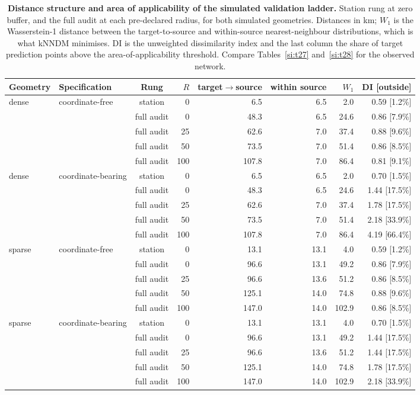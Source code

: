 \documentclass[11pt]{article}
\begin{document}
\begin{table}[htbp]\centering\footnotesize
\caption{\textbf{Distance structure and area of applicability of the simulated validation ladder.} Station rung at zero buffer, and the full audit at each pre-declared radius, for both simulated geometries. Distances in km; $W_1$ is the Wasserstein-1 distance between the target-to-source and within-source nearest-neighbour distributions, which is what kNNDM minimises. DI is the unweighted dissimilarity index and the last column the share of target prediction points above the area-of-applicability threshold. Compare Tables~\ref{si:t27} and~\ref{si:t28} for the observed network.}
\label{tab:simaoa}
\begin{tabular}{llcrrrrr}\toprule
Geometry & Specification & Rung & $R$ & target$\to$source & within source & $W_1$ & DI [outside] \\ \midrule
dense & coordinate-free & station & 0 & 6.5 & 6.5 & 2.0 & 0.59 [1.2\%] \\
 &  & full audit & 0 & 48.3 & 6.5 & 24.6 & 0.86 [7.9\%] \\
 &  & full audit & 25 & 62.6 & 7.0 & 37.4 & 0.88 [9.6\%] \\
 &  & full audit & 50 & 73.5 & 7.0 & 51.4 & 0.86 [8.5\%] \\
 &  & full audit & 100 & 107.8 & 7.0 & 86.4 & 0.81 [9.1\%] \\
\addlinespace
dense & coordinate-bearing & station & 0 & 6.5 & 6.5 & 2.0 & 0.70 [1.5\%] \\
 &  & full audit & 0 & 48.3 & 6.5 & 24.6 & 1.44 [17.5\%] \\
 &  & full audit & 25 & 62.6 & 7.0 & 37.4 & 1.78 [17.5\%] \\
 &  & full audit & 50 & 73.5 & 7.0 & 51.4 & 2.18 [33.9\%] \\
 &  & full audit & 100 & 107.8 & 7.0 & 86.4 & 4.19 [66.4\%] \\
\addlinespace
sparse & coordinate-free & station & 0 & 13.1 & 13.1 & 4.0 & 0.59 [1.2\%] \\
 &  & full audit & 0 & 96.6 & 13.1 & 49.2 & 0.86 [7.9\%] \\
 &  & full audit & 25 & 96.6 & 13.6 & 51.2 & 0.86 [8.5\%] \\
 &  & full audit & 50 & 125.1 & 14.0 & 74.8 & 0.88 [9.6\%] \\
 &  & full audit & 100 & 147.0 & 14.0 & 102.9 & 0.86 [8.5\%] \\
\addlinespace
sparse & coordinate-bearing & station & 0 & 13.1 & 13.1 & 4.0 & 0.70 [1.5\%] \\
 &  & full audit & 0 & 96.6 & 13.1 & 49.2 & 1.44 [17.5\%] \\
 &  & full audit & 25 & 96.6 & 13.6 & 51.2 & 1.44 [17.5\%] \\
 &  & full audit & 50 & 125.1 & 14.0 & 74.8 & 1.78 [17.5\%] \\
 &  & full audit & 100 & 147.0 & 14.0 & 102.9 & 2.18 [33.9\%] \\
\bottomrule\end{tabular}\end{table}
\end{document}
